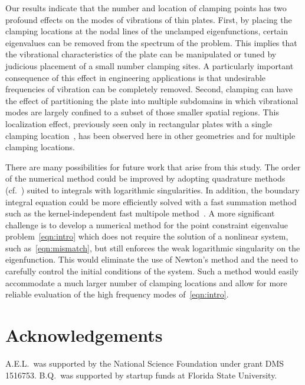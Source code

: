 \documentclass[times]{article}
\begin{document}
Our results indicate that the number and location of clamping points has
two profound effects on the modes of vibrations of thin plates. First,
by placing the clamping locations at the nodal lines of the unclamped
eigenfunctions, certain eigenvalues can be removed from the spectrum of
the problem.  This implies that the vibrational characteristics of the
plate can be manipulated or tuned by judicious placement of a small
number clamping sites. A particularly important consequence of this
effect in engineering applications is that undesirable frequencies of
vibration can be completely removed.  Second, clamping can have the
effect of partitioning the plate into multiple subdomains in which
vibrational modes are largely confined to a subset of those smaller
spatial regions.  This localization effect, previously seen only in
rectangular plates with a single clamping location~\cite{FM}, has been
observed here in other geometries and for multiple clamping locations. 

There are many possibilities for future work that arise from this study.
The order of the numerical method could be improved by adopting
quadrature methods (cf.~\cite{alp1999, kap-rok1997}) suited to integrals
with logarithmic singularities.  In addition, the boundary integral
equation could be more efficiently solved with a fast summation method
such as the kernel-independent fast multipole
method~\cite{yin-bir-zor2004}.  A more significant challenge is to
develop a numerical method for the point constraint eigenvalue
problem~\eqref{eqn:intro} which does not require the solution of a
nonlinear system, such as~\eqref{eqn:mismatch}, but still enforces the
weak logarithmic singularity on the eigenfunction. This would eliminate
the use of Newton's method and the need to carefully control the initial
conditions of the system. Such a method would easily accommodate a much
larger number of clamping locations and allow for more reliable
evaluation of the high frequency modes of~\eqref{eqn:intro}.



\section*{Acknowledgements} A.E.L.~was supported by the National Science
Foundation under grant DMS 1516753.  B.Q.~was supported by startup funds
at Florida State University.
\end{document}
